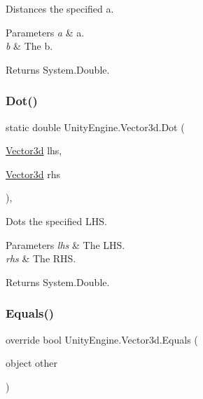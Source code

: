 Distances the specified a. 


\begin{DoxyParams}{Parameters}
{\em a} & a.\\
\hline
{\em b} & The b.\\
\hline
\end{DoxyParams}
\begin{DoxyReturn}{Returns}
System.\+Double.
\end{DoxyReturn}
\mbox{\label{struct_unity_engine_1_1_vector3d_a1c742f5fd820a524c50f519fec2a20ba}} 
\subsubsection{\texorpdfstring{Dot()}{Dot()}}
{\footnotesize\ttfamily static double Unity\+Engine.\+Vector3d.\+Dot (\begin{DoxyParamCaption}\item[{\hyperlink{struct_unity_engine_1_1_vector3d}{Vector3d}}]{lhs,  }\item[{\hyperlink{struct_unity_engine_1_1_vector3d}{Vector3d}}]{rhs }\end{DoxyParamCaption})\hspace{0.3cm}{\ttfamily [inline]}, {\ttfamily [static]}}



Dots the specified L\+HS. 


\begin{DoxyParams}{Parameters}
{\em lhs} & The L\+HS.\\
\hline
{\em rhs} & The R\+HS.\\
\hline
\end{DoxyParams}
\begin{DoxyReturn}{Returns}
System.\+Double.
\end{DoxyReturn}
\mbox{\label{struct_unity_engine_1_1_vector3d_abfd4ffa4f51c5b6713f7f833ae8b85a2}} 
\subsubsection{\texorpdfstring{Equals()}{Equals()}}
{\footnotesize\ttfamily override bool Unity\+Engine.\+Vector3d.\+Equals (\begin{DoxyParamCaption}\item[{object}]{other }\end{DoxyParamCaption})\hspace{0.3cm}{\ttfamily [inline]}}



